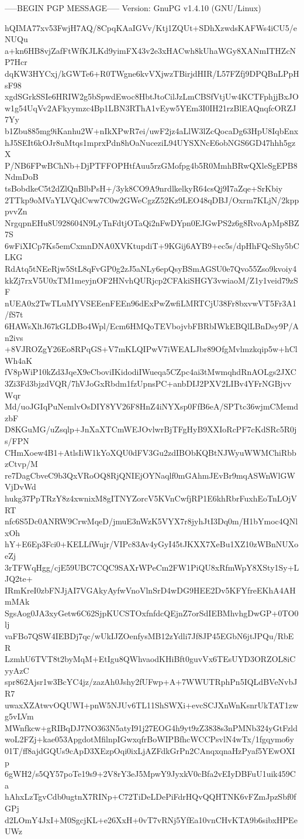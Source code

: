 -----BEGIN PGP MESSAGE-----
Version: GnuPG v1.4.10 (GNU/Linux)

hQIMA77xv53FwjH7AQ/8CpqKAaIGVv/Ktj1ZQUt+SDhXzwdsKAFWs4iCU5/eNUQu
a+kn6HB8vjZafFtWfKJLKd9yimFX43v2e3xHACwh8kUhaWGy8XANmITHZcNP7Hcr
dqKW3HYCxj/kGWTe6+R0TWgne6kvVXjwzTBirjdHIR/L57FZfj9DPQBnLPpHsF98
xgdSGrkSSIe6HRIW2g5bSpwdEwoc8HbtJtoCilJzLmCBSfVtjUw4KCTFphjjBxJO
w1g54UqVv2AFkyymzc4Bp1LBN3RThA1vEyw5YEm3I0IH21rzBlEAQnqfcORZJ7Yy
b1Zbu885mg9iKanhu2W+nIkXPwR7ei/uwF2jz4aLlW3lZcQocaDg63HpU8IqbEnx
hJ5SEIt6kOJr8uMtqs1mprxPdn8hOaNuceziL94UYSXNcE6obNGS6GD47hhh5gzX
P/NB6FPwBChNb+DjPTFFOPHtfAuu5rzGMofpg4b5R0MmhBRwQXleSgEPB8NdmDoB
tsBobdkeC5t2dZlQnBlbPsH+/3yk8CO9A9nrdlkelkyR64csQj9I7aZqe+SrKbiy
2TTkp9oMVaYLVQdCww7C0w2GWeCgzZ52Kz9LEO48qDBJ/Oxrm7KLjN/2kpppvvZn
NrgqpnEHu8U928604N9LyTnFdtjOTaQi2nFwDYpn0EJGwPS2z6g8RvoApMp8BZ7S
6wFiXICp7Ks5emCxmnDNA0XVKtupdiT+9KGij6AYB9+ec5s/dpHhFQcShy5bCLKG
RdAtq5tNEeRjw5StL8qFvGP0g2zJ5aNLy6epQsyBSmAGSU0e7Qvo55Zso9kvoiy4
kkZj7rxV5U0xTM1meyjnOF2HNvhQURjcp2CFAkiSHGY3vwiaoM/Z1y1veid79zSF
nUEA0x2TwTLuMYVSEEenFEEn96dExPwZwfiLMRTCjU38Fr8bxvwVT5Fr3A1/fS7t
6HAWsXltJ67kGLDBo4Wpl/Ecm6HMQoTEVbojvbFBRbIWkEBQlLBnDsy9P/An2ivs
+8VJROZgY26Eo8RPqGS+V7mKLQIPwV7iWEALJbr89OfgMvlmzkqip5w+hClWh4aK
fV8pWiP10kZd3JqeX9eCboviIKidodiIWueqa5CZpc4ai3tMwmqhdRnAOLgs2JXC
3Zi3Fd3bjzdVQR/7hVJoGxRbdm1fzUpnsPC+anbDIJ2PXV2LIBv4YFrNGBjvvWqr
Md/uoJGIqPuNemlvOsDIY8YV26F8HnZ4iNYXsp0FfB6eA/SPTtc36wjmCMemdzbF
D8KGuMG/uZsqlp+JnXaXTCmWEJOvlwrBjTFgHyB9XXIoRcPF7cKdSRc5R0js/FPN
CHmXoew4B1+AtlsIiW1kYoXQU0dFV3Gu2zdIBObKQBtNJWyuWWMChiRbbzCtvp/M
re7DagCbveC9b3QxVRoOQ8RjQNIEjOYNaqlf0mGAhmJEvBr9mqASWnWlGWVjDvWd
hukg37PpTRzY8z4xwnixM8gITNYZorcV5KVnCwfjRP1E6khRbrFuxhEoTnLOjVRT
nfc6S5Dc0ANRW9CrwMqeD/jmuE3nWzK5VYX7r8jyhJtI3Dq0m/H1bYmoc4QNlxOh
hY+E6Ep3Fci0+KELLfWujr/VIPc83Av4yGyI45tJKXX7XeBu1XZ10zWBnNUXoeZj
3rTFWqHgg/cjE59UBC7CQC9SAXrWPeCm2FW1PiQU8xRfmWpY8XSty1Sy+LJQ2te+
IRmKreI0zbFNJjAI7VGAkyAyfwVnoVlnSrD4wDG9HEE2Dv5KFYfreEKhA4AHmMAk
SgsAog0JA3xyGetw6C62SjpKUCSTOxfnfdcQEjnZ7orSdIEBMhvhgDwGP+0TO0lj
vaFBo7QSW4IEBDj7qc/wUkIJZOenfysMB12zYdli7Jf8JP45EGbN6jtJPQu/RbER
LzmhU6TVT8t2byMqM+EtIgu8QWhvaodKHiBft0guvVx6TEsUYD3ORZOL8iCyyAzC
spr862Ajsr1w3BcYC4jz/zazAh0Jshy2fUFwp+A+7WWUTRphPn5IQLdBVeNvbJR7
uwaxXZAtwvOQUWI+pnW5NJUv6TL11ShSWXi+evcSCJXnWnKsnrUkTAT1zwg5vLVm
MWnfkcw+gRIBqDJ7NO363N5atyI91j27EOG4h9yt9zZ3838s3nPMNb324yGtFzld
woL2FZj+kae053ApgdotMfilnpIGwxqfrBoWIPBfhcWCCPsvlN4wTx/1fgqymo6y
01T/ff8ajdGQUs9cApD3XEzpOqi0ixLjAZFdkGrPn2CAnqxqnaHzPyaf5YEwOXIp
6gWH2/s5QY57poTe19s9+2V8rY3eJ5MpwY9JyxkV0cBfa2vEIyDBFuU1uik459Ca
hAhxLzTgvCdb0ugtnX7RINp+C72TiDeLDePiFdrHQvQQHTNK6vFZmJpzSbf0fGPj
d2LOmY4JxI+M0SgcjKL+e26XxH+0vT7vRNj5YfEa10vnCHvKTA9b6sibxHPEeUWz
